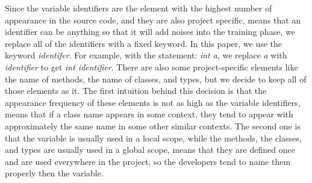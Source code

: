 Since the variable identifiers are the element with the highest number of appearance in the source code, and they are also project specific, means that an identifier can be anything so that it will add noises into the training phase, we replace all of the identifiers with a fixed keyword. In this paper, we use the keyword \textit{identifer}. For example, with the statement: \textit{int a}, we replace \textit{a} with \textit{identifier} to get \textit{int identifier}. There are also some project-specific elements like the name of methods, the name of classes, and types, but we decide to keep all of those elements as it. The first intuition behind this decision is that the appearance frequency of these elements is not as high as the variable identifiers, means that if a class name appears in some context, they tend to appear with approximately the same name in some other similar contexts. The second one is that the variable is usually used in a local scope, while the methods, the classes, and types are usually used in a global scope, means that they are defined once and are used everywhere in the project, so the developers tend to name them properly then the variable.


